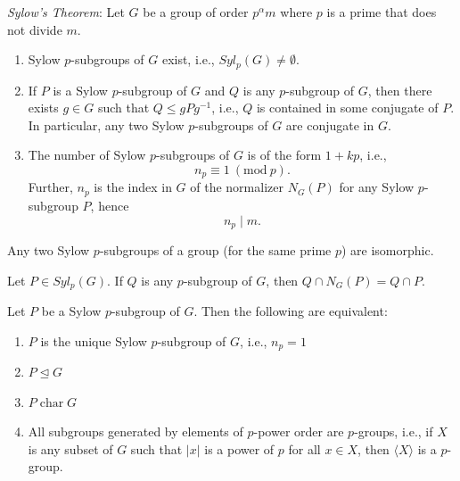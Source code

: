 \documentclass{article}
\newcommand{\Mod}[1]{\ (\mathrm{mod}\ #1)}
\numberwithin{equation}{section}
\theoremstyle{definition}
\numberwithin{definition}{section}
\numberwithin{theorem}{section}
\theoremstyle{remark}
\numberwithin{exercise}{section}
\begin{document}
    \textit{Sylow's Theorem}: Let $G$ be a group of order $p^{\alpha}m$ where $p$ is a prime that does not divide $m$.
    \begin{enumerate}
        \item Sylow $p$-subgroups of $G$ exist, i.e., $Syl_p(G)\neq\emptyset$.
        \item If $P$ is a Sylow $p$-subgroup of $G$ and $Q$ is any $p$-subgroup of $G$, then there exists $g\in G$ such that $Q\leq gPg^{-1}$, i.e., $Q$ is contained in some conjugate of $P$. In particular, any two Sylow $p$-subgroups of $G$ are conjugate in $G$.
        \item The number of Sylow $p$-subgroups of $G$ is of the form $1+kp$, i.e., $$n_p\equiv 1\Mod p.$$ Further, $n_p$ is the index in $G$ of the normalizer $N_G(P)$ for any Sylow $p$-subgroup $P$, hence $$n_p\mid m.$$
    \end{enumerate}
    
    Any two Sylow $p$-subgroups of a group (for the same prime $p$) are isomorphic.
    
    Let $P\in Syl_p(G)$. If $Q$ is any $p$-subgroup of $G$, then $Q\cap N_G(P)=Q\cap P$.
    
    Let $P$ be a Sylow $p$-subgroup of $G$. Then the following are equivalent:
    \begin{enumerate}
        \item $P$ is the unique Sylow $p$-subgroup of $G$, i.e., $n_p=1$
        \item $P\unlhd G$
        \item $P\operatorname{char} G$
        \item All subgroups generated by elements of $p$-power order are $p$-groups, i.e., if $X$ is any subset of $G$ such that $|x|$ is a power of $p$ for all $x\in X$, then $\langle X\rangle$ is a $p$-group.
    \end{enumerate}
    
\end{document}
